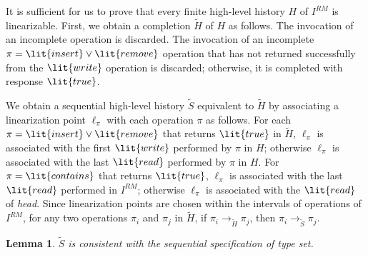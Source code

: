 \documentclass[11pt,pdftex,letterpaper]{article}
\newtheorem{lemma}[theorem]{Lemma}
\newcommand{\true}{\lit{true}}
\begin{document}
It is sufficient for us to prove that every finite high-level history $H$
of $I^{RM}$ is linearizable.
First, we obtain a completion $\tilde H$ of $H$ as follows.
The invocation of an incomplete  operation is discarded.
The invocation of an incomplete $\pi=\lit{insert} \vee \lit{remove}$
operation that has not returned successfully from the $\lit{write}$
operation is discarded; otherwise, it is completed with response $\true$.


We obtain a sequential high-level history $\tilde S$ equivalent to $\tilde H$ by associating a linearization point $\ell_{\pi}$ 
with each operation $\pi$ as follows.
For each $\pi=\lit{insert}\vee\lit{remove}$ that returns $\true$ in $\tilde H$, $\ell_{\pi}$ is associated with 
the first $\lit{write}$ performed by $\pi$ in $H$; otherwise
$\ell_{\pi}$ is associated with the last $\lit{read}$ performed by $\pi$ in $H$. For $\pi=\lit{contains}$ that returns $\true$, $\ell_{\pi}$
is associated with the last $\lit{read}$ performed in $I^{RM}$; otherwise $\ell_{\pi}$ is associated with the $\lit{read}$ of \emph{head}.
Since linearization points are chosen within the intervals of 
operations of $I^{RM}$, for any two operations
$\pi_i$ and $\pi_j$ in ${\tilde H}$, if $\pi_i \rightarrow_{\tilde H}
\pi_j$, then $\pi_i \rightarrow_{\tilde S} \pi_j$.
\begin{lemma}
\label{lem:rlegal}
$\tilde S$ is consistent with the sequential specification of type \textit{set}.
\end{lemma}
\end{document}
